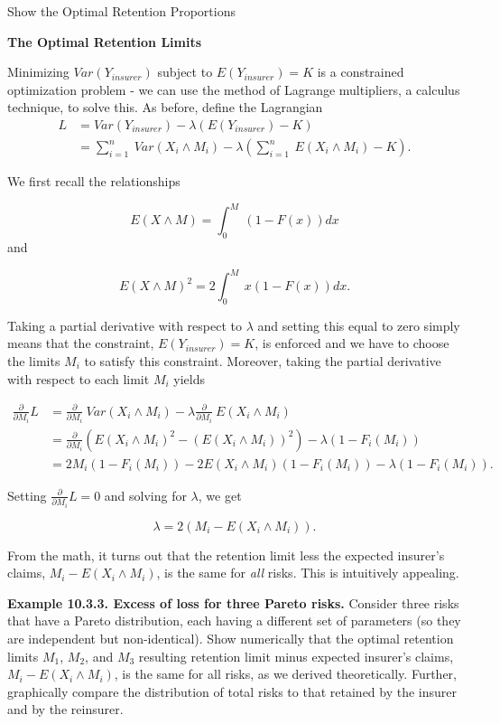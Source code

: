 \documentclass[]{book}
\theoremstyle{definition}
\theoremstyle{definition}
\theoremstyle{definition}
\theoremstyle{remark}
\begin{document}
Show the Optimal Retention Proportions

\hypertarget{toggleDerivationProofExcess}{}
\textbf{The Optimal Retention Limits}

Minimizing \(Var(Y_{insurer})\) subject to \(E(Y_{insurer}) = K\) is a
constrained optimization problem - we can use the method of Lagrange
multipliers, a calculus technique, to solve this. As before, define the
Lagrangian \[
\begin{array}{ll}
L &= Var (Y_{insurer}) - \lambda (E(Y_{insurer}) - K) \\
&= \sum_{i=1}^n ~Var (X_i \wedge M_i) - \lambda (\sum_{i=1}^n ~E(X_i \wedge M_i)- K).
\end{array}
\]

We first recall the relationships

\[
E(X \wedge M) = \int_0^M ~(1- F(x))dx
\] and

\[
E(X \wedge M)^2 = 2\int_0^M ~x(1- F(x))dx.
\]

Taking a partial derivative with respect to \(\lambda\) and setting this
equal to zero simply means that the constraint, \(E(Y_{insurer}) = K\),
is enforced and we have to choose the limits \(M_i\) to satisfy this
constraint. Moreover, taking the partial derivative with respect to each
limit \(M_i\) yields

\[
\begin{array}{ll}
\frac{\partial}{\partial M_i} L 
&= \frac{\partial}{\partial M_i}  ~Var(X_i \wedge M_i)  - \lambda \frac{\partial}{\partial M_i} ~E(X_i \wedge M_i) \\
&= \frac{\partial}{\partial M_i} \left(E(X_i \wedge M_i)^2 -(E(X_i \wedge M_i))^2\right) - \lambda (1-F_i(M_i)) \\
&= 2 M_i (1-F_i(M_i)) - 2 E(X_i \wedge M_i) (1-F_i(M_i))-
\lambda (1-F_i(M_i)).
\end{array}
\]

Setting \(\frac{\partial}{\partial M_i} L =0\) and solving for
\(\lambda\), we get

\[
\lambda = 2 (M_i - E(X_i \wedge M_i)) .
\]

From the math, it turns out that the retention limit less the expected
insurer's claims, \(M_i - E(X_i \wedge M_i)\), is the same for
\emph{all} risks. This is intuitively appealing.

\textbf{Example 10.3.3. Excess of loss for three Pareto risks.} Consider
three risks that have a Pareto distribution, each having a different set
of parameters (so they are independent but non-identical). Show
numerically that the optimal retention limits \(M_1\), \(M_2\), and
\(M_3\) resulting retention limit minus expected insurer's claims,
\(M_i - E(X_i \wedge M_i)\), is the same for all risks, as we derived
theoretically. Further, graphically compare the distribution of total
risks to that retained by the insurer and by the reinsurer.
\end{document}
